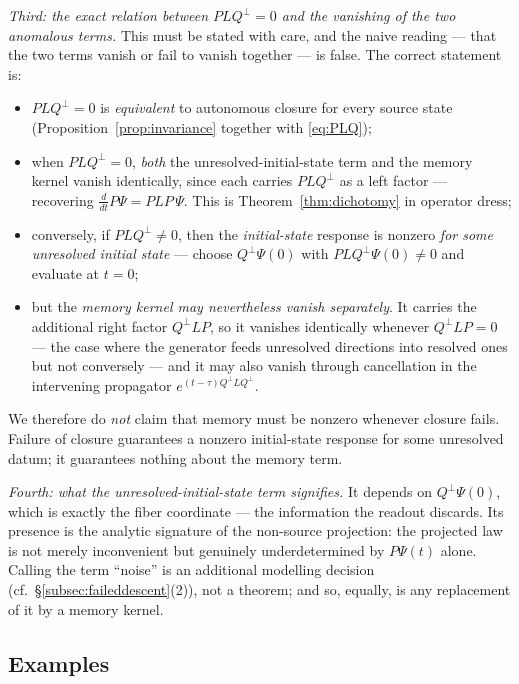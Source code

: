 \documentclass[11pt,reqno]{amsart}
\theoremstyle{plain}
\theoremstyle{definition}
\theoremstyle{remark}
\begin{document}
\emph{Third: the exact relation between $PLQ^{\!\perp}=0$ and the vanishing of the two anomalous terms.} This must be stated with care, and the naive reading --- that the two terms vanish or fail to vanish together --- is false. The correct statement is:
\begin{itemize}
\item $PLQ^{\!\perp}=0$ is \emph{equivalent} to autonomous closure for every source state (Proposition~\ref{prop:invariance} together with \eqref{eq:PLQ});
\item when $PLQ^{\!\perp}=0$, \emph{both} the unresolved-initial-state term and the memory kernel vanish identically, since each carries $PLQ^{\!\perp}$ as a left factor --- recovering $\tfrac{d}{dt}P\Psi=PLP\,\Psi$. This is Theorem~\ref{thm:dichotomy} in operator dress;
\item conversely, if $PLQ^{\!\perp}\neq0$, then the \emph{initial-state} response is nonzero \emph{for some unresolved initial state} --- choose $Q^{\!\perp}\Psi(0)$ with $PLQ^{\!\perp}\Psi(0)\neq0$ and evaluate at $t=0$;
\item but the \emph{memory kernel may nevertheless vanish separately}. It carries the additional right factor $Q^{\!\perp}LP$, so it vanishes identically whenever $Q^{\!\perp}LP=0$ --- the case where the generator feeds unresolved directions into resolved ones but not conversely --- and it may also vanish through cancellation in the intervening propagator $e^{(t-\tau)Q^{\!\perp}LQ^{\!\perp}}$.
\end{itemize}
We therefore do \emph{not} claim that memory must be nonzero whenever closure fails. Failure of closure guarantees a nonzero initial-state response for some unresolved datum; it guarantees nothing about the memory term.

\emph{Fourth: what the unresolved-initial-state term signifies.} It depends on $Q^{\!\perp}\Psi(0)$, which is exactly the fiber coordinate --- the information the readout discards. Its presence is the analytic signature of the non-source projection: the projected law is not merely inconvenient but genuinely underdetermined by $P\Psi(t)$ alone. Calling the term ``noise'' is an additional modelling decision (cf.\ \S\ref{subsec:faileddescent}(2)), not a theorem; and so, equally, is any replacement of it by a memory kernel.

\subsection{Examples}
\end{document}
